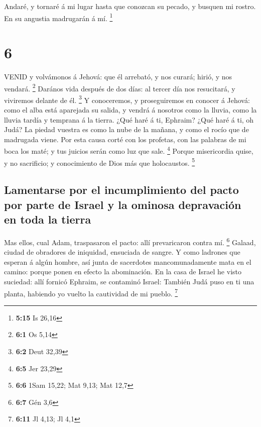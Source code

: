  Andaré, y tornaré á mi lugar hasta que conozcan su pecado,
y busquen mi rostro. En su angustia madrugarán á mí. \footnote{\textbf{5:15}
  Is 26,16}

\hypertarget{section-5}{%
\section{6}\label{section-5}}

 VENID y volvámonos á Jehová: que él arrebató, y nos curará;
hirió, y nos vendará. \footnote{\textbf{6:1} Os 5,14} 
Darános vida después de dos días: al tercer día nos resucitará, y
viviremos delante de él. \footnote{\textbf{6:2} Deut 32,39} 
Y conoceremos, y proseguiremos en conocer á Jehová: como el alba está
aparejada su salida, y vendrá á nosotros como la lluvia, como la lluvia
tardía y temprana á la tierra.  ¿Qué haré á ti, Ephraim?
¿Qué haré á ti, oh Judá? La piedad vuestra es como la nube de la mañana,
y como el rocío que de madrugada viene.  Por esta causa
corté con los profetas, con las palabras de mi boca los maté; y tus
juicios serán como luz que sale. \footnote{\textbf{6:5} Jer 23,29}
 Porque misericordia quise, y no sacrificio; y conocimiento
de Dios más que holocaustos. \footnote{\textbf{6:6} 1Sam 15,22; Mat
  9,13; Mat 12,7}

\hypertarget{lamentarse-por-el-incumplimiento-del-pacto-por-parte-de-israel-y-la-ominosa-depravaciuxf3n-en-toda-la-tierra}{%
\subsection{Lamentarse por el incumplimiento del pacto por parte de
Israel y la ominosa depravación en toda la
tierra}\label{lamentarse-por-el-incumplimiento-del-pacto-por-parte-de-israel-y-la-ominosa-depravaciuxf3n-en-toda-la-tierra}}

 Mas ellos, cual Adam, traspasaron el pacto: allí
prevaricaron contra mí. \footnote{\textbf{6:7} Gén 3,6} 
Galaad, ciudad de obradores de iniquidad, ensuciada de sangre.
 Y como ladrones que esperan á algún hombre, así junta de
sacerdotes mancomunadamente mata en el camino: porque ponen en efecto la
abominación.  En la casa de Israel he visto suciedad: allí
fornicó Ephraim, se contaminó Israel:  También Judá puso en
ti una planta, habiendo yo vuelto la cautividad de mi pueblo.
\footnote{\textbf{6:11} Jl 4,13; Jl 4,1}

